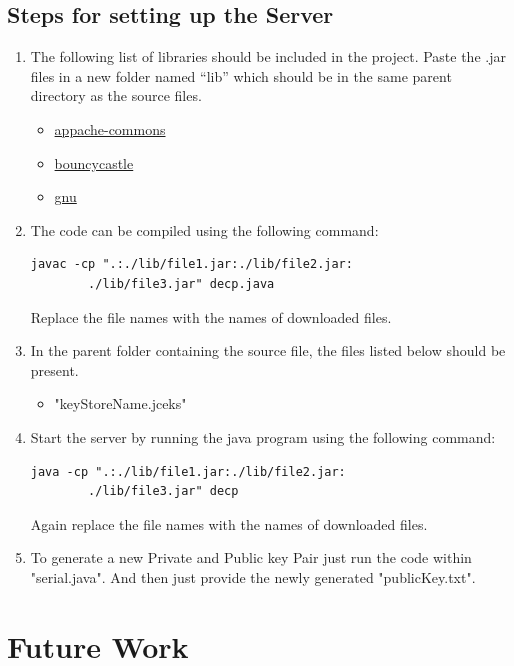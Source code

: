 \documentclass[a4paper,12pt,oneside]{book}
\begin{document}
\subsection{Steps for setting up the Server}
\begin{enumerate}
\item The following list of libraries should be included in the project. Paste the .jar files in a new folder named ``lib'' which should be in the same parent directory as the source files.
\begin{itemize}
	\item \href{http://www.java2s.com/Code/JarDownload/apache-commons/apache-commons}{appache-commons}
	\item \href{https://downloads.bouncycastle.org/java/bcprov-ext-jdk15on-154.jar}{bouncycastle}
	\item \href{http://www.java2s.com/Code/JarDownload/rxtx/rxtx-2.1.7.jar.zip}{gnu}
\end{itemize}
\item The code can be compiled using the following command:
\begin{verbatim}
javac -cp ".:./lib/file1.jar:./lib/file2.jar:
		./lib/file3.jar" decp.java 
\end{verbatim}

Replace the file names with the names of downloaded files.
 
\item In the parent folder containing the source file, the files listed below should be present.
	\begin{itemize} 
		\item "keyStoreName.jceks"
	
	\end{itemize} 
\item Start the server by running the java program using the following command:
\begin{verbatim}
java -cp ".:./lib/file1.jar:./lib/file2.jar:
		./lib/file3.jar" decp 
\end{verbatim}
Again replace the file names with the names of downloaded files.

\item To generate a new Private and Public key Pair just run the code within "serial.java". And then just provide the newly generated "publicKey.txt".

\end{enumerate}


\newpage

\section{Future Work}
\end{document}
